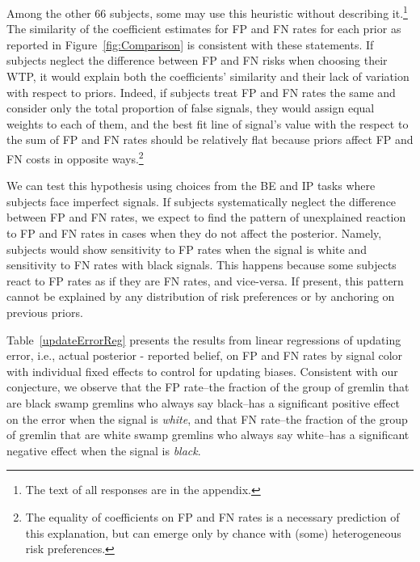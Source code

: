 \documentclass[12pt,a4paper]{article}
\begin{document}
Among the other 66 subjects, some may use this heuristic without describing it.\footnote{The text of all responses are in the appendix.} The similarity of the coefficient estimates for FP and FN rates for each prior as reported in Figure~\ref{fig:Comparison} is consistent with these statements. If subjects neglect the difference between FP and FN risks when choosing their WTP, it would explain both the coefficients' similarity and their lack of variation with respect to priors. Indeed, if subjects treat FP and FN rates the same and consider only the total proportion of false signals, they would assign equal weights to each of them, and the best fit line of signal's value with the respect to the sum of FP and FN rates should be relatively flat because priors affect FP and FN costs in opposite ways.\footnote{The equality of coefficients on FP and FN rates is a necessary prediction of this explanation, but can emerge only by chance with (some) heterogeneous risk preferences.}


We can test this hypothesis using choices from the BE and IP tasks where subjects face imperfect signals. If subjects systematically neglect the difference between FP and FN rates, we expect to find the pattern of unexplained reaction to FP and FN rates in cases when they do not affect the posterior. Namely, subjects would show sensitivity to FP rates when the signal is white and sensitivity to FN rates with black  signals. This happens because some subjects react to FP rates as if they are FN rates, and vice-versa. If present, this pattern cannot be explained by any distribution of risk preferences or by anchoring on previous priors.  

Table~\ref{updateErrorReg} presents the results from linear regressions of updating error, i.e., actual posterior - reported belief, on FP and FN rates by signal color with individual fixed effects to control for updating biases. Consistent with our conjecture, we observe that the FP rate--the fraction of the group of gremlin that are black swamp gremlins who always say black--has a significant positive effect on the error when the signal is \textit{white}, and that FN rate--the fraction of the group of gremlin that are white swamp gremlins who always say white--has a significant negative effect when the signal is \textit{black}. 


\end{document}
